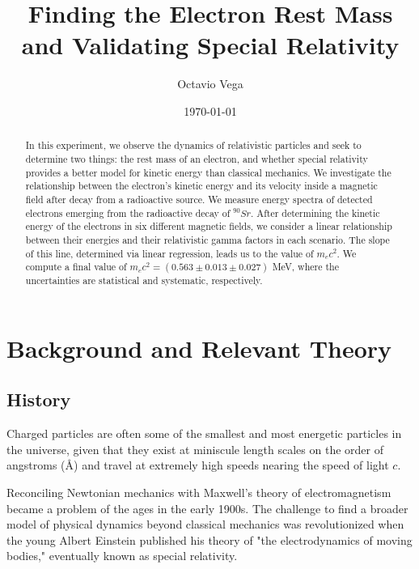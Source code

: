 \documentclass[aps,twocolumn,secnumarabic,balancelastpage,amsmath,amssymb,nofootinbib, floatfix]{revtex4-2}
\begin{document}
	\title{Finding the Electron Rest Mass and Validating Special Relativity}
	\author{Octavio Vega}
	\date{\today}
	
	\begin{abstract}
		In this experiment, we observe the dynamics of relativistic particles and seek to determine two things: the rest mass of an electron, and whether special relativity provides a better model for kinetic energy than classical mechanics. We investigate the relationship between the electron's kinetic energy and its velocity inside a magnetic field after decay from a radioactive source. We measure energy spectra of detected electrons emerging from the radioactive decay of $^{90}Sr$. After determining the kinetic energy of the electrons in six different magnetic fields, we consider a linear relationship between their energies and their relativistic gamma factors in each scenario. The slope of this line, determined via linear regression, leads us to the value of $m_{e}c^{2}$. We compute a final value of $m_{e}c^{2}=\left(0.563\pm 0.013\pm 0.027\right)$ MeV, where the uncertainties are statistical and systematic, respectively.
	\end{abstract}
	
	\maketitle
	
	
	\section{Background and Relevant Theory}
	
	\subsection{History}
	Charged particles are often some of the smallest and most energetic particles in the universe, given that they exist at miniscule length scales on the order of angstroms ($\si{\angstrom}$) and travel at extremely high speeds nearing the speed of light $c$. 
	
	Reconciling Newtonian mechanics with Maxwell's theory of electromagnetism became a problem of the ages in the early 1900s. The challenge to find a broader model of physical dynamics beyond classical mechanics was revolutionized when the young Albert Einstein published his theory of "the electrodynamics of moving bodies," eventually known as special relativity. 
	
\end{document}
